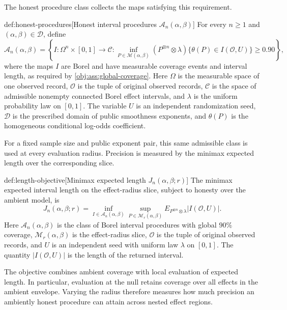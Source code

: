 \documentclass[11pt]{article}
\begin{document}
The honest procedure class  collects the maps satisfying this requirement.

\begin{definitionv}{def:honest-procedures}[Honest interval procedures $\mathcal A_n(\alpha,\beta)$]
For every \(n\ge1\) and \((\alpha,\beta)\in\mathcal D\), define
\[
\mathcal A_n(\alpha,\beta)
=
\left\{
I:\Omega^n\times[0,1]\to\mathcal C:
\inf_{P\in\mathcal M(\alpha,\beta)}
(P^{\otimes n}\otimes\lambda)
\{\theta(P)\in I(\mathcal O,U)\}
\ge0.90
\right\},
\]
where the maps \(I\) are Borel and have measurable coverage events and interval length, as required by \cref{obj:ass:global-coverage}. Here \(\Omega\) is the measurable space of one observed record, \(\mathcal O\) is the tuple of original observed records, \(\mathcal C\) is the space of admissible nonempty connected Borel effect intervals, and \(\lambda\) is the uniform probability law on \([0,1]\). The variable \(U\) is an independent randomization seed, \(\mathcal D\) is the prescribed domain of public smoothness exponents, and \(\theta(P)\) is the homogeneous conditional log-odds coefficient.
\end{definitionv}

For a fixed sample size and public exponent pair, this same admissible class is used at every evaluation radius. Precision is measured by the minimax expected length  over the corresponding slice.

\begin{definitionv}{def:length-objective}[Minimax expected length $J_n(\alpha,\beta;r)$]
The minimax expected interval length on the effect-radius slice, subject to honesty over the ambient model, is
\[
J_n(\alpha,\beta;r)
=
\inf_{I\in\mathcal A_n(\alpha,\beta)}
\sup_{P\in\mathcal M_r(\alpha,\beta)}
E_{P^{\otimes n}\otimes\lambda}
\bigl|I(\mathcal O,U)\bigr|.
\]
Here \(\mathcal A_n(\alpha,\beta)\) is the class of Borel interval procedures with global \(90\%\) coverage, \(\mathcal M_r(\alpha,\beta)\) is the effect-radius slice, \(\mathcal O\) is the tuple of original observed records, and \(U\) is an independent seed with uniform law \(\lambda\) on \([0,1]\). The quantity \(\lvert I(\mathcal O,U)\rvert\) is the length of the returned interval.
\end{definitionv}

The objective combines ambient coverage with local evaluation of expected length. In particular, evaluation at the null retains coverage over all effects in the ambient envelope. Varying the radius therefore measures how much precision an ambiently honest procedure can attain across nested effect regions.
\end{document}
